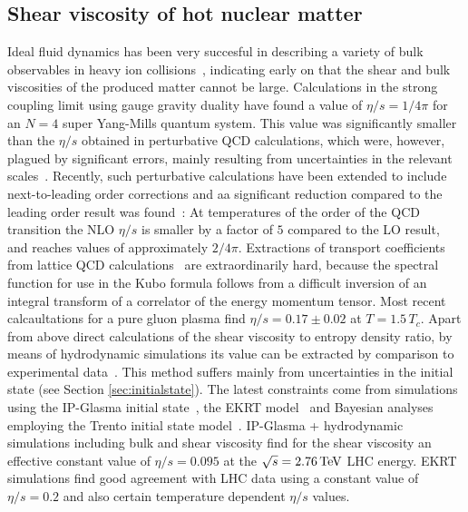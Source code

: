 \subsection{Shear viscosity of hot nuclear matter}
Ideal fluid dynamics has been very succesful in describing a variety of 
  bulk observables in heavy ion collisions~\cite{Kolb:2003dz,Huovinen:2003fa,Hirano:2002ds}, 
  indicating early on that the shear and bulk viscosities of the produced 
  matter cannot be large. 
Calculations in the strong coupling limit using gauge gravity duality have 
  found a value of $\eta/s=1/4\pi$ for an $N = 4$ super Yang-Mills 
  quantum system. 
This value was significantly smaller than the $\eta/s$ obtained in 
  perturbative QCD calculations, which were, however, plagued by 
  significant errors, mainly resulting from uncertainties in the 
  relevant scales~\cite{Arnold:2003zc}. 
Recently, such perturbative calculations have been extended to include 
  next-to-leading order corrections and aa significant reduction compared 
  to the leading order result was found~\cite{Ghiglieri:2018dgf}: 
At temperatures of the order of the QCD transition the NLO $\eta/s$ 
  is smaller by a factor of $5$ compared to the LO result, and reaches 
  values of approximately $2/4\pi$. 
Extractions of transport coefficients from lattice QCD calculations~\cite{Nakamura:2004sy,Meyer:2007ic,Pasztor:2018yae} 
  are extraordinarily hard, because the spectral function for use in 
  the Kubo formula follows from a difficult inversion of an integral 
  transform of a correlator of the energy momentum tensor. 
Most recent calcaultations for a pure gluon plasma find $\eta/s=0.17\pm 0.02$ at $T=1.5\,T_c$.
Apart from above direct calculations of the shear viscosity to entropy 
  density ratio, by means of hydrodynamic simulations its value can be 
  extracted by comparison to experimental data~\cite{Gale:2013da,Heinz:2013th}. 
This method suffers mainly from uncertainties in the initial state (see Section \ref{sec:initialstate}). 
The latest constraints come from simulations using the IP-Glasma initial 
  state~\cite{Schenke:2012wb,Schenke:2012fw}, the EKRT model~\cite{Niemi:2015qia} 
  and Bayesian analyses employing the Trento initial state model~\cite{Moreland:2018gsh}. 
IP-Glasma + hydrodynamic simulations including bulk and shear viscosity 
  find for the shear viscosity an effective constant value of $\eta/s=0.095$ 
  at the $\sqrt{s}=2.76\,{\rm TeV}$ LHC energy.%
EKRT simulations find good agreement with LHC data using a constant value 
  of $\eta/s=0.2$ and also certain temperature dependent $\eta/s$ values.
